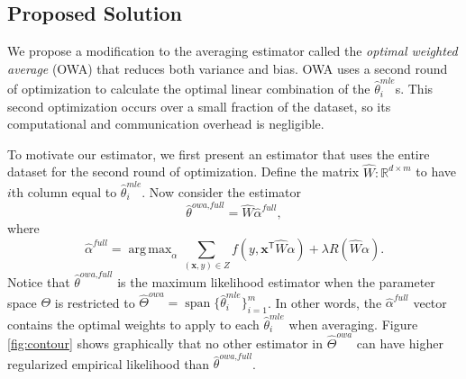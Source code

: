 \documentclass[twoside]{article}
\DeclareMathOperator*{\argmin}{arg\,min}
\DeclareMathOperator*{\argmax}{arg\,max}
\DeclareMathOperator*{\vecspan}{span}
\newcommand{\Q}{\mathcal{Q}}
\newcommand{\matW}{\hat W}
\newcommand{\W}{{\hat \Theta^{\textit{owa}}}}
\newcommand{\x}{\mathbf{x}}
\newcommand{\w}{\theta}
\newcommand{\ahat}{\hat\alpha}
\newcommand{\afull}{\ahat^{\textit{full}}}
\newcommand{\wowafull}{\hat\w^{\textit{owa,full}}}
\newcommand{\wmle}{\hat\w^{mle}}
\newcommand{\wstar}{{\w^{*}}}
\newcommand{\wq}{\hat\w^{q}}
\newcommand{\wqstar}{\hat\w^{q^*}}
\newcommand{\trans}[1]{\ensuremath{{#1}^{\mathsf{T}}}}
\newcommand{\ltwo}[1]{{\lVert {#1} \rVert}}
\begin{document}

\subsection{Proposed Solution}

We propose a modification to the averaging estimator called the \emph{optimal weighted average} (OWA) that reduces both variance and bias.
OWA uses a second round of optimization to calculate the optimal linear combination of the $\wmle_i$s.
This second optimization occurs over a small fraction of the dataset,
so its computational and communication overhead is negligible.

To motivate our estimator,
we first present an estimator that uses the entire dataset for the second round of optimization.
Define the matrix $\matW : \mathbb{R}^{d\times m}$ to have $i$th column equal to $\wmle_i$.
Now consider the estimator
\begin{equation}
\wowafull = \matW \afull
,
\end{equation}
where
\begin{equation}
\label{eq:afull}
\afull = \argmax_\alpha \sum _{(\x,y)\in Z} f\left(y,\trans\x \matW \alpha \right)
+
\lambda R(\matW\alpha)
.
\end{equation}
Notice that $\wowafull$ is the maximum likelihood estimator when the parameter space $\Theta$ is restricted to $\W = \vecspan \{\wmle_i\}_{i=1}^m$.
In other words, the $\afull$ vector contains the optimal weights to apply to each $\wmle_i$ when averaging.
Figure \ref{fig:contour} shows graphically that no other estimator in $\W$ can have higher regularized empirical likelihood than $\wowafull$.
\end{document}
